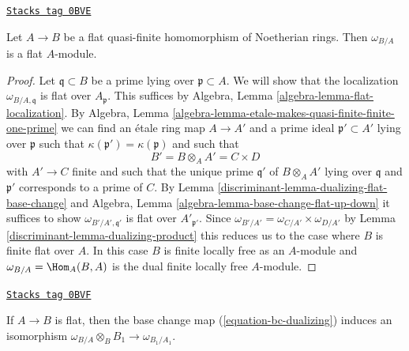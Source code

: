 \begin{lemma}
\label{discriminant-lemma-dualizing-base-flat-flat}
\href{https://stacks.math.columbia.edu/tag/0BVE}{\texttt{Stacks tag 0BVE}}

Let $A \to B$ be a flat quasi-finite homomorphism of Noetherian rings.
Then $\omega_{B/A}$ is a flat $A$-module.
\end{lemma}

\begin{proof}

Let $\mathfrak q \subset B$ be a prime lying over $\mathfrak p \subset A$.
We will show that the localization $\omega_{B/A, \mathfrak q}$ is flat
over $A_\mathfrak p$.
This suffices by Algebra, Lemma \ref{algebra-lemma-flat-localization}.
By
Algebra, Lemma \ref{algebra-lemma-etale-makes-quasi-finite-finite-one-prime}
we can find an \'etale ring map $A \to A'$ and a prime
ideal $\mathfrak p' \subset A'$ lying over $\mathfrak p$
such that $\kappa(\mathfrak p') = \kappa(\mathfrak p)$ and
such that
$$
B' = B \otimes_A A' = C \times D
$$
with $A' \to C$ finite and such that the unique prime $\mathfrak q'$
of $B \otimes_A A'$ lying over $\mathfrak q$ and $\mathfrak p'$
corresponds to a prime of $C$. By
Lemma \ref{discriminant-lemma-dualizing-flat-base-change}
and Algebra, Lemma \ref{algebra-lemma-base-change-flat-up-down}
it suffices to show $\omega_{B'/A', \mathfrak q'}$
is flat over $A'_{\mathfrak p'}$.
Since $\omega_{B'/A'} = \omega_{C/A'} \times \omega_{D/A'}$
by Lemma \ref{discriminant-lemma-dualizing-product}
this reduces us to the case where $B$ is finite flat over $A$.
In this case $B$ is finite locally free as an $A$-module
and $\omega_{B/A} = \Hom_A(B, A)$ is the dual finite
locally free $A$-module.
\end{proof}

\begin{lemma}
\label{discriminant-lemma-dualizing-base-change-of-flat}
\href{https://stacks.math.columbia.edu/tag/0BVF}{\texttt{Stacks tag 0BVF}}

If $A \to B$ is flat, then the base change map (\ref{equation-bc-dualizing})
induces an isomorphism $\omega_{B/A} \otimes_B B_1 \to \omega_{B_1/A_1}$.
\end{lemma}

